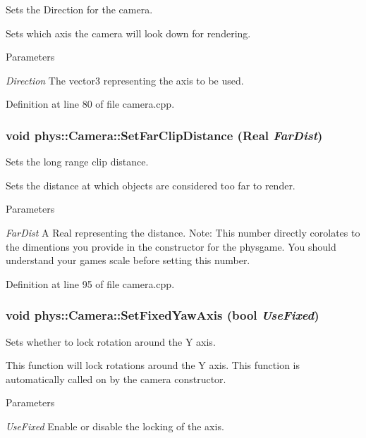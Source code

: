 Sets the Direction for the camera. 

Sets which axis the camera will look down for rendering. 
\begin{DoxyParams}{Parameters}
\item[{\em Direction}]The vector3 representing the axis to be used. \end{DoxyParams}


Definition at line 80 of file camera.cpp.

\hypertarget{classphys_1_1Camera_a25408db8110ac5035fafbd58a5b1106d}{
\subsubsection[{SetFarClipDistance}]{\setlength{\rightskip}{0pt plus 5cm}void phys::Camera::SetFarClipDistance ({\bf Real} {\em FarDist})}}
\label{d9/df8/classphys_1_1Camera_a25408db8110ac5035fafbd58a5b1106d}


Sets the long range clip distance. 

Sets the distance at which objects are considered too far to render. 
\begin{DoxyParams}{Parameters}
\item[{\em FarDist}]A Real representing the distance. Note: This number directly corolates to the dimentions you provide in the constructor for the physgame. You should understand your games scale before setting this number. \end{DoxyParams}


Definition at line 95 of file camera.cpp.

\hypertarget{classphys_1_1Camera_a1b4d5be85c528541c7a1cbebb41bfd89}{
\subsubsection[{SetFixedYawAxis}]{\setlength{\rightskip}{0pt plus 5cm}void phys::Camera::SetFixedYawAxis (bool {\em UseFixed})}}
\label{d9/df8/classphys_1_1Camera_a1b4d5be85c528541c7a1cbebb41bfd89}


Sets whether to lock rotation around the Y axis. 

This function will lock rotations around the Y axis. This function is automatically called on by the camera constructor. 
\begin{DoxyParams}{Parameters}
\item[{\em UseFixed}]Enable or disable the locking of the axis. \end{DoxyParams}


